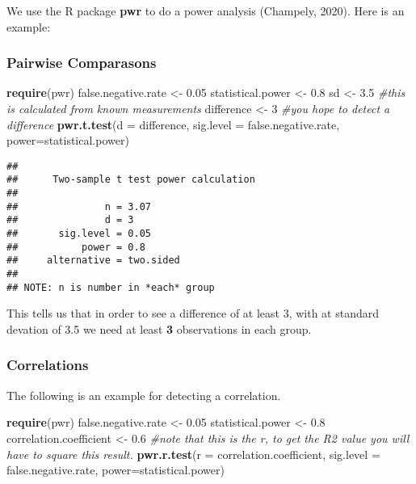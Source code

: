 \documentclass[
]{article}
\newenvironment{Shaded}{\begin{snugshade}}{\end{snugshade}}
\newcommand{\AttributeTok}[1]{\textcolor[rgb]{0.13,0.29,0.53}{#1}}
\newcommand{\CommentTok}[1]{\textcolor[rgb]{0.56,0.35,0.01}{\textit{#1}}}
\newcommand{\DecValTok}[1]{\textcolor[rgb]{0.00,0.00,0.81}{#1}}
\newcommand{\FloatTok}[1]{\textcolor[rgb]{0.00,0.00,0.81}{#1}}
\newcommand{\FunctionTok}[1]{\textcolor[rgb]{0.13,0.29,0.53}{\textbf{#1}}}
\newcommand{\NormalTok}[1]{#1}
\newcommand{\OtherTok}[1]{\textcolor[rgb]{0.56,0.35,0.01}{#1}}
\begin{document}
We use the R package \textbf{pwr} to do a power analysis (Champely,
2020). Here is an example:

\subsubsection{Pairwise Comparasons}\label{pairwise-comparasons}

\begin{Shaded}
\begin{Highlighting}[]
\FunctionTok{require}\NormalTok{(pwr)}
\NormalTok{false.negative.rate }\OtherTok{\textless{}{-}} \FloatTok{0.05}
\NormalTok{statistical.power }\OtherTok{\textless{}{-}} \FloatTok{0.8}
\NormalTok{sd }\OtherTok{\textless{}{-}} \FloatTok{3.5} \CommentTok{\#this is calculated from known measurements}
\NormalTok{difference }\OtherTok{\textless{}{-}} \DecValTok{3}  \CommentTok{\#you hope to detect a difference }
\FunctionTok{pwr.t.test}\NormalTok{(}\AttributeTok{d =}\NormalTok{ difference, }\AttributeTok{sig.level =}\NormalTok{ false.negative.rate, }\AttributeTok{power=}\NormalTok{statistical.power)}
\end{Highlighting}
\end{Shaded}

\begin{verbatim}
## 
##      Two-sample t test power calculation 
## 
##               n = 3.07
##               d = 3
##       sig.level = 0.05
##           power = 0.8
##     alternative = two.sided
## 
## NOTE: n is number in *each* group
\end{verbatim}

This tells us that in order to see a difference of at least 3, with at
standard devation of 3.5 we need at least \textbf{3} observations in
each group.

\subsubsection{Correlations}\label{correlations}

The following is an example for detecting a correlation.

\begin{Shaded}
\begin{Highlighting}[]
\FunctionTok{require}\NormalTok{(pwr)}
\NormalTok{false.negative.rate }\OtherTok{\textless{}{-}} \FloatTok{0.05}
\NormalTok{statistical.power }\OtherTok{\textless{}{-}} \FloatTok{0.8}
\NormalTok{correlation.coefficient }\OtherTok{\textless{}{-}} \FloatTok{0.6} \CommentTok{\#note that this is the r, to get the R2 value you will have to square this result.}
\FunctionTok{pwr.r.test}\NormalTok{(}\AttributeTok{r =}\NormalTok{ correlation.coefficient, }\AttributeTok{sig.level =}\NormalTok{ false.negative.rate, }\AttributeTok{power=}\NormalTok{statistical.power)}
\end{Highlighting}
\end{Shaded}
\end{document}
